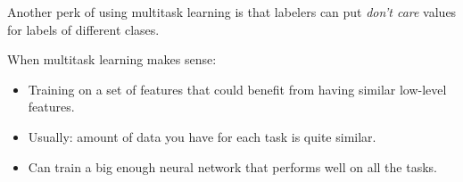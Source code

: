 Another perk of using multitask learning is that labelers can put \emph{don't care} values for labels of different clases.

When multitask learning makes sense: 

\begin{itemize}
    \item Training on a set of features that could benefit from having similar low-level features. 
    \item Usually: amount of data you have for each task is quite similar. 
    \item Can train a big enough neural network that performs well on all the tasks. 
\end{itemize}
